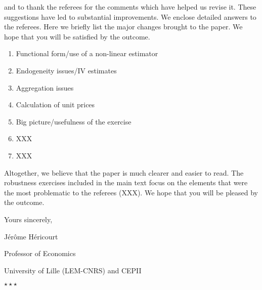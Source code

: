 \documentclass[12pt]{article}
\newcommand*\sepstars{%
  \begin{center}
    $\star\star\star$
  \end{center}}
\begin{document}
and to thank the referees for the comments which have helped us revise it. These suggestions have led to substantial improvements. We enclose detailed answers to the referees. Here we briefly list the major changes brought to the paper. We hope that you will be satisfied by the outcome.

\begin{enumerate}


\item Functional form/use of a non-linear estimator
\item Endogeneity issues/IV estimates
\item Aggregation issues
\item Calculation of unit prices
\item Big picture/usefulness of the exercise
\item XXX
\item XXX


\end{enumerate}

Altogether, we believe that the paper is much clearer and easier to read. The robustness exercises included in the main text focus on the elements that were the most problematic to the referees (XXX). We hope that you will be pleased by the outcome.

\bigskip

Yours sincerely,

\bigskip

\hfill Jérôme Héricourt

\hfill Professor of Economics

\hfill University of Lille (LEM-CNRS) and CEPII

\bigskip
\bigskip
\bigskip
\sepstars
\end{document}
